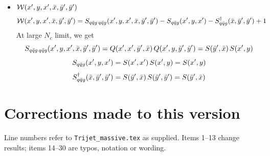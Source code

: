 \documentclass[9pt]{article}
\numberwithin{equation}{section}
\begin{document}
\begin{itemize}
\item $\mathcal{W}(x',y,x',\Bar{x},\Bar{y}',\Bar{y}')$
    \begin{align}
        \mathcal{W}(x',y,x',\Bar{x},\Bar{y}',\Bar{y}') & = S_{q\Bar{q}g\,q\Bar{q}g}(x',y,x',\Bar{x},\Bar{y}',\Bar{y}') -S_{q\Bar{q}g}(x',y,x') - S^{\dagger}_{q\Bar{q}g}(\Bar{x},\Bar{y}',\Bar{y}') + 1
    \end{align}
At large $N_{c}$ limit, we get
$$S_{q\Bar{q}g\,q\Bar{q}g}(x',y,x',\Bar{x},\Bar{y}',\Bar{y}') = Q(x',x',\Bar{y}',\Bar{x})\, Q(x',y,\Bar{y}',\Bar{y}') = S(\Bar{y}',\Bar{x})\, S(x',y) $$
$$S_{q\Bar{q}g}(x',y,x') = S(x',x')\, S(x',y) = S(x',y)$$
$$S^{\dagger}_{q\Bar{q}g}(\Bar{x},\Bar{y}',\Bar{y}') = S(\Bar{y}',\Bar{x})\, S(\Bar{y}',\Bar{y}') = S(\Bar{y}',\Bar{x}) $$
\end{itemize}

\appendix
\section{Corrections made to this version}
Line numbers refer to \texttt{Trijet\_massive.tex} as supplied. Items 1--13 change results; items 14--30 are typos, notation or wording.
\end{document}

